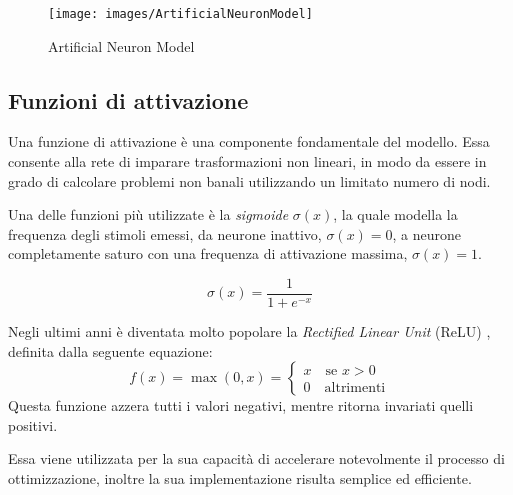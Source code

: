 \begin{figure}[htb]
	\centering
	{\texttt{[image: images/ArtificialNeuronModel]}} 
	\caption{Artificial Neuron Model}
	\label{fig:Modello matematico di un neurone artificiale}
\end{figure}

\subsection{Funzioni di attivazione}
\label{subsec:fattivazione}
Una funzione di attivazione è una componente fondamentale del modello. Essa consente alla rete di imparare trasformazioni non lineari, in modo da essere in grado di calcolare problemi non banali utilizzando un limitato numero di nodi.

Una delle funzioni più utilizzate è la \emph{sigmoide} $\sigma(x)$, la quale modella la frequenza degli stimoli emessi, da neurone inattivo, $\sigma(x)=0$, a neurone completamente saturo con una frequenza di attivazione massima, $\sigma(x)=1$.

\begin{equation}
\sigma(x) = \frac{1}{1+e^{-x}}
\label{eq:sigmoid}
\end{equation}


Negli ultimi anni è diventata molto popolare la \emph{Rectified Linear Unit} (ReLU) \cite{nair2010rectified,hahnloser2000digital,hahnloser2003permitted,glorot2011deep}, definita dalla seguente equazione:
\begin{equation}
f (x) = \max(0, x)= \begin{cases}
x \quad \mbox{se } x>0\\
0 \quad \mbox{altrimenti}
\end{cases}
\label{eq:relu}
\end{equation}
Questa funzione azzera tutti i valori negativi, mentre ritorna invariati quelli positivi.

Essa viene utilizzata per la sua capacità di accelerare notevolmente il processo di ottimizzazione, inoltre la sua implementazione risulta semplice ed efficiente.

